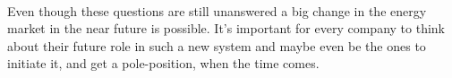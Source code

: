 \documentclass{scrartcl}
\begin{document}
	\paragraph{}
	Even though these questions are still unanswered a big change in the energy market in the near future is possible. It's important for every company to think about their future role in such a new system and maybe even be the ones to initiate it, and get a pole-position, when the time comes. 
    
\end{document}
